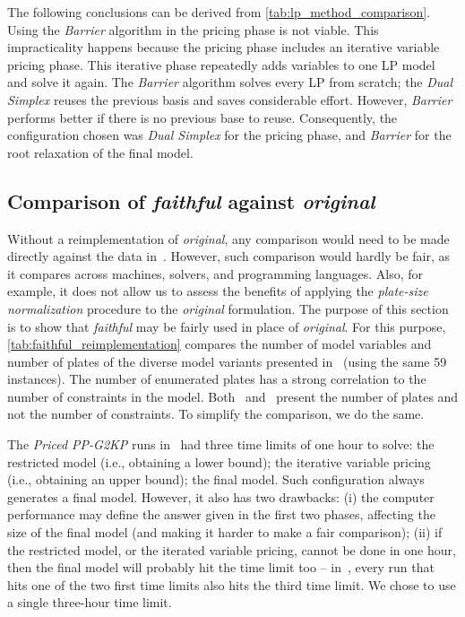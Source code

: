 \documentclass[smallextended]{svjour3}       %
\begin{document}
The following conclusions can be derived from \autoref{tab:lp_method_comparison}.
Using the \emph{Barrier} algorithm in the pricing phase is not viable.
This impracticality happens because the pricing phase includes an iterative variable pricing phase.
This iterative phase repeatedly adds variables to one LP model and solve it again.
The \emph{Barrier} algorithm solves every LP from scratch;
the \emph{Dual Simplex} reuses the previous basis and saves considerable effort.
However, \emph{Barrier} performs better if there is no previous base to reuse.
Consequently, the configuration chosen was \emph{Dual Simplex} for the pricing phase, and \emph{Barrier} for the root relaxation of the final model.

\subsection{Comparison of \emph{faithful} against \emph{original}}
\label{sec:faithful_reimplementation}

Without a reimplementation of \emph{original}, any comparison would need to be made directly against the data in~\cite{dimitri_thesis}.
However, such comparison would hardly be fair, as it compares across machines, solvers, and programming languages.
Also, for example, it does not allow us to assess the benefits of applying the \emph{plate-size normalization} procedure to the \emph{original} formulation.
The purpose of this section is to show that \emph{faithful} may be fairly used in place of \emph{original}.
For this purpose, \autoref{tab:faithful_reimplementation} compares the number of model variables and number of plates of the diverse model variants presented in~\cite{furini:2016,dimitri_thesis} (using the same 59 instances).
The number of enumerated plates has a strong correlation to the number of constraints in the model.
Both~\cite{furini:2016} and~\cite{dimitri_thesis} present the number of plates and not the number of constraints.
To simplify the comparison, we do the same.

The \emph{Priced PP-G2KP} runs in~\cite{furini:2016,dimitri_thesis} had three time limits of one hour to solve: the restricted model (i.e., obtaining a lower bound); the iterative variable pricing (i.e., obtaining an upper bound); the final model.
Such configuration always generates a final model.
However, it also has two drawbacks:
(i) the computer performance may define the answer given in the first two phases, affecting the size of the final model (and making it harder to make a fair comparison);
(ii) if the restricted model, or the iterated variable pricing, cannot be done in one hour, then the final model will probably hit the time limit too -- in~\cite{furini:2016}, every run that hits one of the two first time limits also hits the third time limit.
We chose to use a single three-hour time limit.
\end{document}
